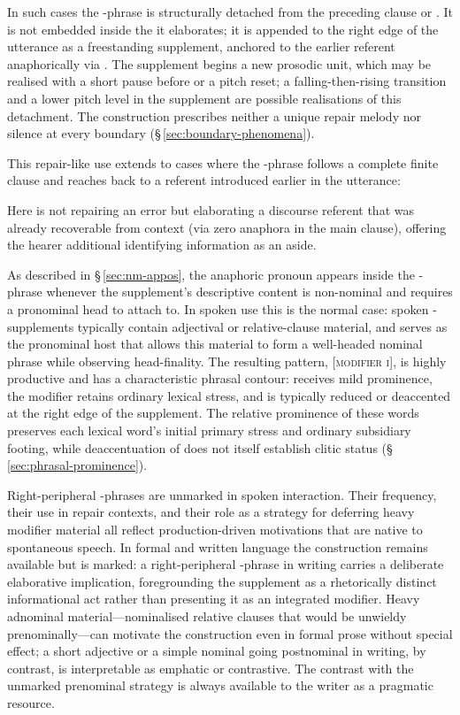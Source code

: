 In such cases the -phrase is structurally detached from the preceding
clause or . It is not embedded inside the  it
elaborates; it is appended to the right edge of the utterance as a freestanding
supplement, anchored to the earlier referent anaphorically via . The
supplement begins a new prosodic unit, which may be realised with a short
pause before  or a pitch reset; a falling-then-rising transition and
a lower pitch level in the supplement are possible realisations of this
detachment. The construction prescribes neither a unique repair melody nor
silence at every boundary (§\,\ref{sec:boundary-phenomena}).

This repair-like use extends to cases where the -phrase follows a
complete finite clause and reaches back to a referent introduced earlier in the
utterance:

\pex
\a {}
\xe

Here  is not repairing an error but elaborating a
discourse referent that was already recoverable from context (via zero anaphora
in the main clause), offering the hearer additional identifying information as
an aside.

As described in \S\,\ref{sec:nm-appos}, the anaphoric pronoun 
appears inside the -phrase whenever the supplement's descriptive content
is non-nominal and requires a pronominal head to attach to. In spoken use this
is the normal case: spoken -supplements typically contain adjectival or
relative-clause material, and  serves as the pronominal host that allows
this material to form a well-headed nominal phrase while observing
head-finality. The resulting pattern,  \textsc{[modifier i]}, is highly
productive and has a characteristic phrasal contour:  receives mild
prominence, the modifier retains ordinary lexical stress, and  is
typically reduced or deaccented at the right edge of the supplement. The
relative prominence of these words preserves each lexical word's initial
primary stress and ordinary subsidiary footing, while deaccentuation of
 does not itself establish clitic status
(§\,\ref{sec:phrasal-prominence}).

Right-peripheral -phrases are unmarked in spoken interaction. Their
frequency, their use in repair contexts, and their role as a strategy for
deferring heavy modifier material all reflect production-driven motivations that
are native to spontaneous speech. In formal and written language the
construction remains available but is marked: a right-peripheral -phrase
in writing carries a deliberate elaborative implication, foregrounding the
supplement as a rhetorically distinct informational act rather than presenting
it as an integrated modifier. Heavy adnominal material---nominalised relative
clauses that would be unwieldy prenominally---can motivate the construction even
in formal prose without special effect; a short adjective or a simple nominal
going postnominal in writing, by contrast, is interpretable as emphatic or
contrastive. The contrast with the unmarked prenominal strategy is always
available to the writer as a pragmatic resource.
